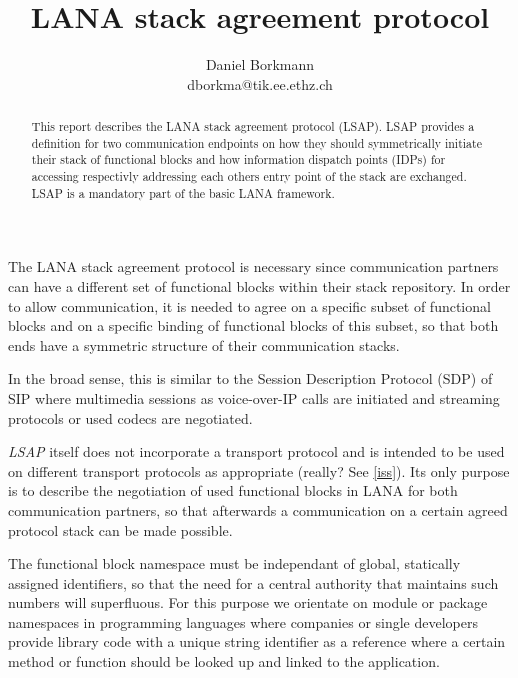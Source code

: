 \documentclass[times,10pt,twocolumn]{article}
\begin{document}
\title{
LANA stack agreement protocol\\\smallskip [DRAFT]
}

\author{
Daniel Borkmann\\
dborkma@tik.ee.ethz.ch\\
}

\maketitle
\thispagestyle{empty}

\begin{abstract}
This report describes the LANA stack agreement protocol (LSAP). LSAP 
provides a definition for two communication endpoints on how they should 
symmetrically initiate their stack of functional blocks and how information
dispatch points (IDPs) for accessing respectivly addressing each others
entry point of the stack are exchanged. LSAP is a mandatory part of the 
basic LANA framework.
\end{abstract}

The LANA stack agreement protocol is necessary since communication partners can have 
a different set of functional blocks within their stack repository. In order 
to allow communication, it is needed to agree on a specific subset of 
functional blocks and on a specific binding of functional blocks of this 
subset, so that both ends have a symmetric structure of their communication
stacks.\newline

In the broad sense, this is similar to the Session Description Protocol (SDP)
\cite{VanJacobsonet.al.2006} of SIP \cite{HenningSchulzrinneet.al.2002} where
multimedia sessions as voice-over-IP calls are initiated and streaming
protocols or used codecs are negotiated.\newline

\textit{LSAP} itself does not incorporate a transport protocol and is intended 
to be used on different transport protocols as appropriate (really? See \ref{iss}). Its only purpose
is to describe the negotiation of used functional blocks in LANA for both 
communication partners, so that afterwards a communication on a certain
agreed protocol stack can be made possible.\newline

\label{fbns}
The functional block namespace must be independant of global, statically
assigned identifiers, so that the need for a central authority that maintains
such numbers will superfluous. For this purpose we orientate on module or 
package namespaces in programming languages where companies or single 
developers provide library code with a unique string identifier as a reference
where a certain method or function should be looked up and linked to the
application.\newline
\end{document}
